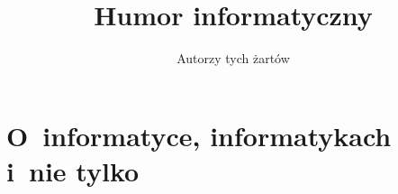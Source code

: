 \documentclass[10pt,t]{beamer}
\title{Humor informatyczny}
\author{Autorzy tych żartów}
\begin{document}





\RaggedRight





\maketitle


















\section{O~informatyce, informatykach i~nie tylko}
\end{document}
